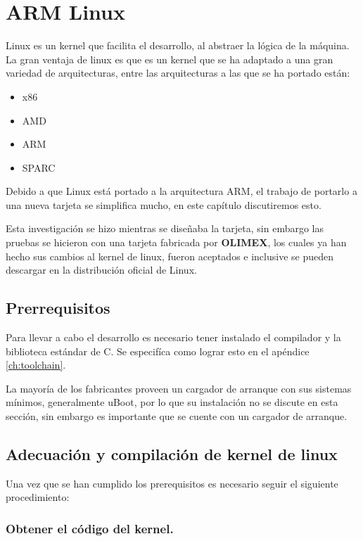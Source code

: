 \chapter{ARM Linux}\label{ch:arm_linux}

Linux es un kernel que facilita el desarrollo, al abstraer la lógica de la máquina. La gran ventaja de linux es que es un kernel que se ha adaptado a una gran variedad de arquitecturas, entre las arquitecturas a las que se ha portado están:

\begin{itemize}
\item x86
\item AMD
\item ARM
\item SPARC
\end{itemize}

Debido a que Linux está portado a la arquitectura ARM, el trabajo de portarlo a una nueva tarjeta se simplifica mucho, en este capítulo discutiremos esto.

Esta investigación se hizo mientras se diseñaba la tarjeta, sin embargo las pruebas se hicieron con una tarjeta fabricada por \textbf{OLIMEX}, los cuales ya han hecho sus cambios al kernel de linux, fueron aceptados e inclusive se pueden descargar en la distribución oficial de Linux.

\section{Prerrequisitos}

Para llevar a cabo el desarrollo es necesario tener instalado el compilador y la biblioteca estándar de C. Se especifíca como lograr esto en el apéndice \ref{ch:toolchain}.

La mayoría de los fabricantes proveen un cargador de arranque con sus sistemas mínimos, generalmente uBoot, por lo que su instalación no se discute en esta sección, sin embargo es importante que se cuente con un cargador de arranque.

\section{Adecuaci\'on y compilaci\'on de kernel de linux}

Una vez que se han cumplido los prerequisitos es necesario seguir el siguiente procedimiento:

\subsection{Obtener el c\'odigo del kernel.}

